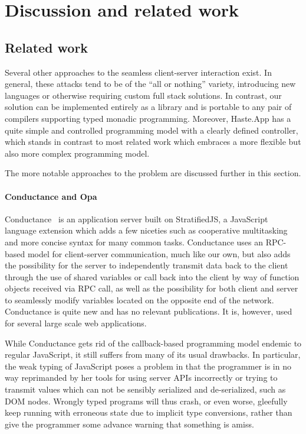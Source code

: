 \documentclass[preprint]{sigplanconf}
\begin{document}
\section{Discussion and related work}

\subsection{Related work}
\label{sec:related}

Several other approaches to the seamless client-server interaction exist. In
general, these attacks tend to be of the ``all or nothing'' variety,
introducing new languages or otherwise requiring custom full stack solutions.
In contrast, our solution can be implemented entirely as a library and is
portable to any pair of compilers supporting typed monadic programming.
Moreover, Haste.App has a quite simple and controlled programming model with a
clearly defined controller, which stands in contrast to most related work which
embraces a more flexible but also more complex programming model.

The more notable approaches to the problem are discussed further in this section.

\paragraph{Conductance and Opa} Conductance\ \cite{conductance} is an application
server built on StratifiedJS, a JavaScript language extension which adds a few
niceties such as cooperative multitasking and more concise syntax for many
common tasks.
Conductance uses an RPC-based model for client-server communication, much like
our own, but also adds the possibility for the server to independently transmit
data back to the client through the use of shared variables or call back into
the client by way of function objects received via RPC call, as well as the
possibility for both client and server to seamlessly modify variables located
on the opposite end of the network. Conductance is quite new and has no
relevant publications. It is, however, used for several large scale web
applications.

While Conductance gets rid of the callback-based programming model endemic to
regular JavaScript, it still suffers from many of its usual drawbacks. In
particular, the weak typing of JavaScript poses a problem in that the
programmer is in no way reprimanded by her tools for using server APIs
incorrectly or trying to transmit values which can not be sensibly serialized
and de-serialized, such as DOM nodes. Wrongly typed programs will thus crash, or
even worse, gleefully keep running with erroneous state due to implicit type
conversions, rather than give the programmer some advance warning that something
is amiss.
\end{document}
